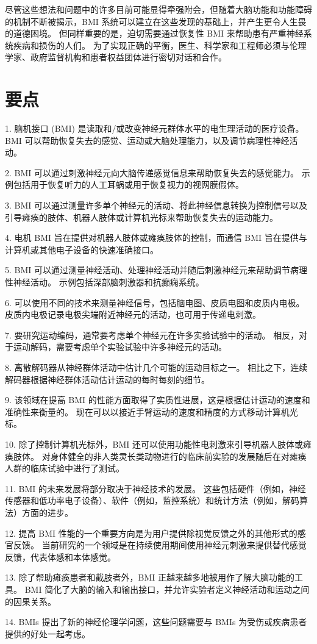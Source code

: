 尽管这些想法和问题中的许多目前可能显得牵强附会，但随着大脑功能和功能障碍的机制不断被揭示，BMI 系统可以建立在这些发现的基础上，并产生更令人生畏的道德困境。
但同样重要的是，迫切需要通过恢复性 BMI 来帮助患有严重神经系统疾病和损伤的人们。
为了实现正确的平衡，医生、科学家和工程师必须与伦理学家、政府监督机构和患者权益团体进行密切对话和合作。


\section{要点}

1. 脑机接口 (BMI) 是读取和/或改变神经元群体水平的电生理活动的医疗设备。
BMI 可以帮助恢复失去的感觉、运动或大脑处理能力，以及调节病理性神经活动。


2. BMI 可以通过刺激神经元向大脑传递感觉信息来帮助恢复失去的感觉能力。
示例包括用于恢复听力的人工耳蜗或用于恢复视力的视网膜假体。


3. BMI 可以通过测量许多单个神经元的活动、将此神经信息转换为控制信号以及引导瘫痪的肢体、机器人肢体或计算机光标来帮助恢复失去的运动能力。


4. 电机 BMI 旨在提供对机器人肢体或瘫痪肢体的控制，而通信 BMI 旨在提供与计算机或其他电子设备的快速准确接口。


5. BMI 可以通过测量神经活动、处理神经活动并随后刺激神经元来帮助调节病理性神经活动。
示例包括深部脑刺激器和抗癫痫系统。


6. 可以使用不同的技术来测量神经信号，包括脑电图、皮质电图和皮质内电极。
皮质内电极记录电极尖端附近神经元的活动，也可用于传递电刺激。


7. 要研究运动编码，通常要考虑单个神经元在许多实验试验中的活动。
相反，对于运动解码，需要考虑单个实验试验中许多神经元的活动。


8. 离散解码器从神经群体活动中估计几个可能的运动目标之一。
相比之下，连续解码器根据神经群体活动估计运动的每时每刻的细节。


9. 该领域在提高 BMI 的性能方面取得了实质性进展，这是根据估计运动的速度和准确性来衡量的。
现在可以以接近手臂运动的速度和精度的方式移动计算机光标。


10. 除了控制计算机光标外，BMI 还可以使用功能性电刺激来引导机器人肢体或瘫痪肢体。
对身体健全的非人类灵长类动物进行的临床前实验的发展随后在对瘫痪人群的临床试验中进行了测试。


11. BMI 的未来发展将部分取决于神经技术的发展。
这些包括硬件（例如，神经传感器和低功率电子设备）、软件（例如，监控系统）和统计方法（例如，解码算法）方面的进步。


12. 提高 BMI 性能的一个重要方向是为用户提供除视觉反馈之外的其他形式的感官反馈。
当前研究的一个领域是在持续使用期间使用神经元刺激来提供替代感觉反馈，代表体感和本体感觉。


13. 除了帮助瘫痪患者和截肢者外，BMI 正越来越多地被用作了解大脑功能的工具。
BMI 简化了大脑的输入和输出接口，并允许实验者定义神经活动和运动之间的因果关系。


14. BMIs 提出了新的神经伦理学问题，这些问题需要与 BMIs 为受伤或疾病患者提供的好处一起考虑。

